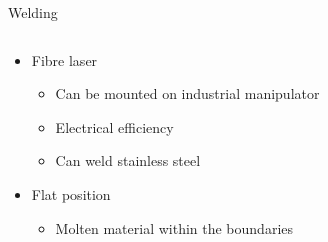 \begin{frame}{Welding}
\begin{columns}

\begin{column}{0.6\textwidth}
\begin{itemize}
    \item Fibre laser
    \begin{itemize}
        \item Can be mounted on industrial manipulator
        \item Electrical efficiency
        \item Can weld stainless steel
    \end{itemize}
    \item Flat position
    \begin{itemize}
        \item Molten material within the boundaries
    \end{itemize}
\end{itemize}
\end{column}

\begin{column}{0.4\textwidth}
\begin{figure}
\end{figure}
\end{column}
\end{columns}
\end{frame}










